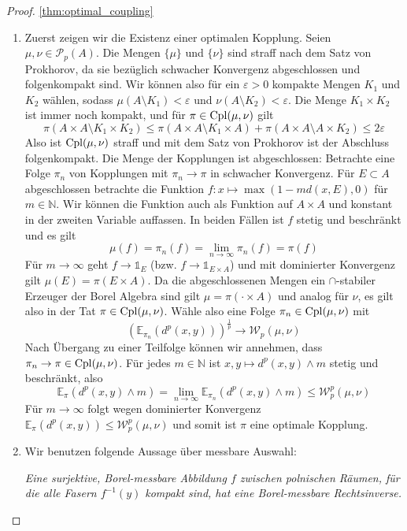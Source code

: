 \begin{proof}\ref{thm:optimal_coupling}
    \begin{enumerate}
        \item
    Zuerst zeigen wir die Existenz einer optimalen Kopplung. Seien $\mu, \nu \in \mathcal{P}_p(A)$. Die Mengen $\{\mu\}$ und $\{\nu\}$ sind straff nach dem Satz von Prokhorov, da sie bezüglich schwacher Konvergenz abgeschlossen und folgenkompakt sind. Wir können also für ein $\varepsilon > 0$ kompakte Mengen $K_1$ und $K_2$ wählen, sodass $\mu(A\setminus K_1) < \varepsilon$ und $\nu(A\setminus K_2) < \varepsilon$. Die Menge $K_1 \times K_2$ ist immer noch kompakt, und für $\pi \in \operatorname{Cpl}(\mu, \nu)$ gilt 
    $$\pi(A\times A \setminus K_1 \times K_2) \leq \pi(A\times A \setminus K_1 \times A) + \pi(A\times A \setminus A \times K_2) \leq 2\varepsilon$$
    Also ist $\operatorname{Cpl}(\mu, \nu)$ straff und mit dem Satz von Prokhorov ist der Abschluss folgenkompakt. Die Menge der Kopplungen ist abgeschlossen: Betrachte eine Folge $\pi_n$ von Kopplungen mit $\pi_n \rightarrow \pi$ in schwacher Konvergenz. Für $E \subset A$ abgeschlossen betrachte die Funktion $f:x\mapsto \max(1-md(x, E), 0)$ für $m \in \mathbb{N}$. Wir können die Funktion auch als Funktion auf $A \times A$ und konstant in der zweiten Variable auffassen. In beiden Fällen ist $f$ stetig und beschränkt und es gilt
    $$\mu(f) = \pi_n(f) = \lim_{n\rightarrow \infty}\pi_n(f) = \pi(f)$$
    Für $m \rightarrow \infty$ geht $f\rightarrow \mathds{1}_E$ (bzw. $f\rightarrow \mathds{1}_{E\times A}$) und mit dominierter Konvergenz gilt $\mu(E) = \pi(E\times A)$. Da die abgeschlossenen Mengen ein $\cap$-stabiler Erzeuger der Borel Algebra sind gilt $\mu = \pi(\cdot \times A)$ und analog für $\nu$, es gilt also in der Tat $\pi \in \operatorname{Cpl}(\mu, \nu)$. Wähle also eine Folge $\pi_n\in \operatorname{Cpl}(\mu, \nu)$ mit 
    $$\left(\mathbb{E}_{\pi_n}(d^p(x,y))\right)^{\frac{1}{p}} \rightarrow \mathcal{W}_p(\mu, \nu)$$
    Nach Übergang zu einer Teilfolge können wir annehmen, dass $\pi_n \rightarrow \pi \in \operatorname{Cpl}(\mu, \nu)$. Für jedes $m \in \mathbb{N}$ ist $x,y\mapsto d^p(x,y)\wedge m$ stetig und beschränkt, also 
    $$\mathbb{E}_\pi(d^p(x,y)\wedge m) = \lim_{n\rightarrow \infty} \mathbb{E}_{\pi_n}(d^p(x,y) \wedge m) \leq \mathcal{W}_p^p(\mu, \nu)$$
    Für $m \rightarrow \infty$ folgt wegen dominierter Konvergenz $\mathbb{E}_\pi(d^p(x,y))\leq \mathcal{W}_p^p(\mu, \nu)$ und somit ist $\pi$ eine optimale Kopplung.
\item 
    Wir benutzen folgende Aussage über messbare Auswahl:

    \emph{Eine surjektive, Borel-messbare Abbildung $f$ zwischen polnischen Räumen, für die alle Fasern $f^{-1}(y)$ kompakt sind, hat eine Borel-messbare Rechtsinverse.}

    \end{enumerate}
\end{proof}
